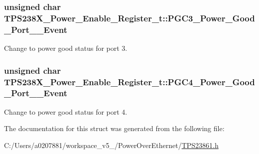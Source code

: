 \hypertarget{struct_t_p_s238_x___power___enable___register__t_a2391ef3673f7408e577f7dc93ebf4002}{
\subsubsection[{P\-G\-C3\-\_\-\-Power\-\_\-\-Good\-\_\-\-Port\-\_\-3\-\_\-\-Event}]{\setlength{\rightskip}{0pt plus 5cm}unsigned char T\-P\-S238\-X\-\_\-\-Power\-\_\-\-Enable\-\_\-\-Register\-\_\-t\-::\-P\-G\-C3\-\_\-\-Power\-\_\-\-Good\-\_\-\-Port\-\_\-\_\-\-Event}}\label{struct_t_p_s238_x___power___enable___register__t_a2391ef3673f7408e577f7dc93ebf4002}


Change to power good status for port 3. 

\hypertarget{struct_t_p_s238_x___power___enable___register__t_abd6d5d7b0657dd074bac96118960234c}{
\subsubsection[{P\-G\-C4\-\_\-\-Power\-\_\-\-Good\-\_\-\-Port\-\_\-4\-\_\-\-Event}]{\setlength{\rightskip}{0pt plus 5cm}unsigned char T\-P\-S238\-X\-\_\-\-Power\-\_\-\-Enable\-\_\-\-Register\-\_\-t\-::\-P\-G\-C4\-\_\-\-Power\-\_\-\-Good\-\_\-\-Port\-\_\-\_\-\-Event}}\label{struct_t_p_s238_x___power___enable___register__t_abd6d5d7b0657dd074bac96118960234c}


Change to power good status for port 4. 



The documentation for this struct was generated from the following file\-:\begin{DoxyCompactItemize}
\item 
C\-:/\-Users/a0207881/workspace\-\_\-v5\-\_/\-Power\-Over\-Ethernet/\hyperlink{_t_p_s23861_8h}{T\-P\-S23861.\-h}\end{DoxyCompactItemize}
